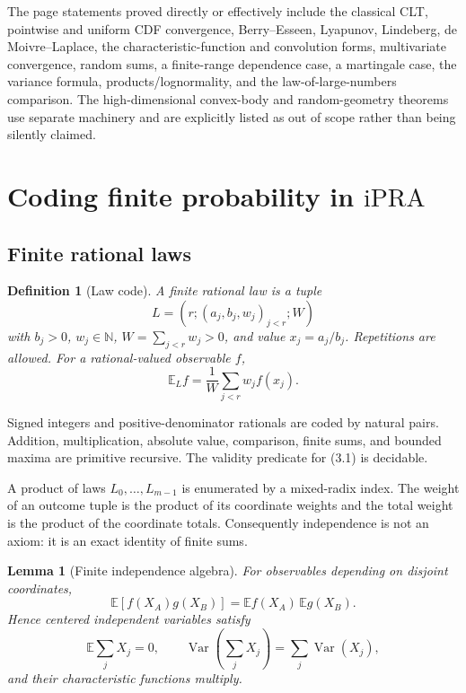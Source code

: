 \documentclass[11pt]{article}
\newtheorem{lemma}[theorem]{Lemma}
\newtheorem{definition}[theorem]{Definition}
\newcommand{\N}{\mathbb N}
\newcommand{\E}{\mathbb E}
\newcommand{\Var}{\operatorname{Var}}
\newcommand{\ipra}{\mathrm{iPRA}}
\begin{document}
The page statements proved directly or effectively include the classical
CLT, pointwise and uniform CDF convergence, Berry--Esseen, Lyapunov,
Lindeberg, de Moivre--Laplace, the characteristic-function and convolution
forms, multivariate convergence, random sums, a finite-range dependence
case, a martingale case, the variance formula, products/lognormality, and the
law-of-large-numbers comparison.  The high-dimensional convex-body and
random-geometry theorems use separate machinery and are explicitly listed as
out of scope rather than being silently claimed.

\section{Coding finite probability in \texorpdfstring{\(\ipra\)}{iPRA}}\label{sec:coding}

\subsection{Finite rational laws}

\begin{definition}[Law code]
A finite rational law is a tuple
\[
 L=(r;(a_j,b_j,w_j)_{j<r};W)                           \tag{3.1}
\]
with \(b_j>0\), \(w_j\in\N\), \(W=\sum_{j<r}w_j>0\),
and value \(x_j=a_j/b_j\).  Repetitions are allowed.  For a rational-valued
observable \(f\),
\[
 \E_L f=\frac1W\sum_{j<r}w_j f(x_j).                  \tag{3.2}
\]
\end{definition}

Signed integers and positive-denominator rationals are coded by natural
pairs.  Addition, multiplication, absolute value, comparison, finite sums,
and bounded maxima are primitive recursive.  The validity predicate for
(3.1) is decidable.

A product of laws \(L_0,\ldots,L_{m-1}\) is enumerated by a mixed-radix
index.  The weight of an outcome tuple is the product of its coordinate
weights and the total weight is the product of the coordinate totals.
Consequently independence is not an axiom: it is an exact identity of finite
sums.

\begin{lemma}[Finite independence algebra]\label{lem:finite-algebra}
For observables depending on disjoint coordinates,
\[
 \E[f(X_A)g(X_B)]=\E f(X_A)\,\E g(X_B).                \tag{3.3}
\]
Hence centered independent variables satisfy
\[
 \E\sum_jX_j=0,
 \qquad \Var\!\left(\sum_jX_j\right)=\sum_j\Var(X_j), \tag{3.4}
\]
and their characteristic functions multiply.
\end{lemma}
\end{document}
